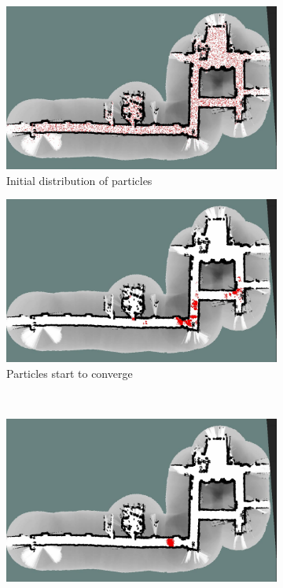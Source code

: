 \begin{figure}[h]
\centering
\begin{subfigure}[b]{0.49\textwidth}
\includegraphics[width=\linewidth]{figures/Screenshot-video_log1-10k_good-1}
\caption{Initial distribution of particles}
\label{fig:Screenshot-video_log1-10k_good-1}
\end{subfigure}
\begin{subfigure}[b]{0.49\textwidth}
\includegraphics[width=\linewidth]{figures/Screenshot-video_log1-10k_good-2}
\caption{Particles start to converge}
\label{fig:Screenshot-video_log1-10k_good-2}
\end{subfigure}
\\
\begin{subfigure}[b]{0.49\textwidth}
\includegraphics[width=\linewidth]{figures/Screenshot-video_log1-10k_good-3}

\end{subfigure}
\end{figure}
